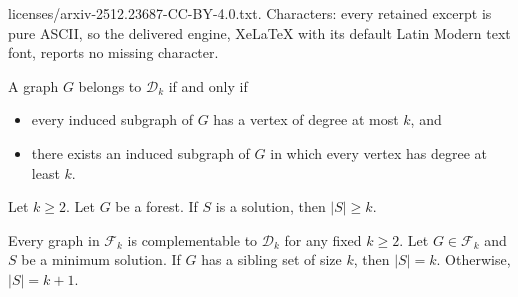 \documentclass[10pt,a4paper]{amsart}
\begin{document}
licenses/arxiv-2512.23687-CC-BY-4.0.txt. Characters: every retained excerpt is pure ASCII, so the delivered engine, XeLaTeX with its default Latin Modern text font, reports no missing character.
\begin{proposition} \label{prop:GinmathcalD_kthenaandb}
A graph $G$ belongs to $\mathcal{D}_k$ if and only if
\begin{itemize}
    \item[(a)] every induced subgraph of $G$ has a vertex of degree at most $k$, and
    \item[(b)] there exists an induced subgraph of $G$ in which every vertex has degree at least $k$.
\end{itemize}
\end{proposition}

\begin{proposition} \label{prop:Sgeqk}
Let $k \geq 2$.
Let $G$ be a forest. If $S$ is a solution, then $|S| \geq k$.
\end{proposition}

\begin{lemma}
\label{lemma:forest-to-degeneracy}
Every graph in $\mathcal{F}_k$ is complementable to $\mathcal{D}_k$ for any fixed $k\geq 2$.
 Let $G \in \mathcal{F}_k$
and $S$ be a minimum solution.
    If $G$ has a sibling set of size $k$,
    then $|S|=k$. Otherwise, $|S|=k+1$.
\end{lemma}
\end{document}
